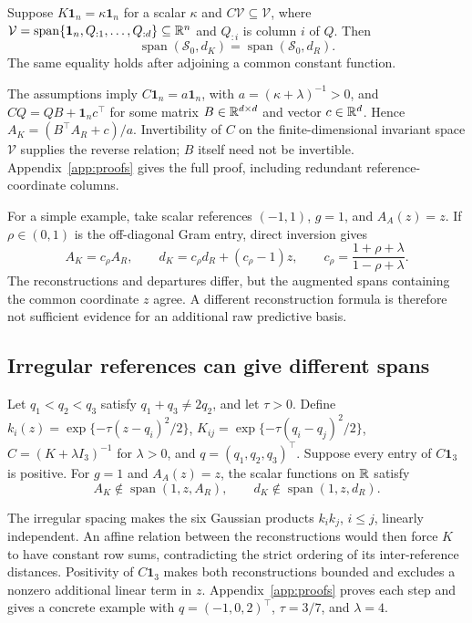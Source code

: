 \begin{proposition}\label{prop:equal}
Suppose $K\mathbf1_n=\kappa\mathbf1_n$ for a scalar $\kappa$ and $C\mathcal V\subseteq\mathcal V$, where
$\mathcal V=\operatorname{span}\{\mathbf1_n,Q_{:1},\ldots,Q_{:d}\}\subseteq\mathbb R^n$ and $Q_{:i}$ is column $i$ of $Q$. Then
\[
 \operatorname{span}(\mathcal S_0,d_K)=\operatorname{span}(\mathcal S_0,d_R).
\]
The same equality holds after adjoining a common constant function.
\end{proposition}

The assumptions imply $C\mathbf1_n=a\mathbf1_n$, with $a=(\kappa+\lambda)^{-1}>0$, and $CQ=QB+\mathbf1_n c^\top$ for some matrix $B\in\mathbb R^{d\times d}$ and vector $c\in\mathbb R^d$. Hence $A_K=(B^\top A_R+c)/a$. Invertibility of $C$ on the finite-dimensional invariant space $\mathcal V$ supplies the reverse relation; $B$ itself need not be invertible. Appendix~\ref{app:proofs} gives the full proof, including redundant reference-coordinate columns.

For a simple example, take scalar references $(-1,1)$, $g=1$, and $A_A(z)=z$. If $\rho\in(0,1)$ is the off-diagonal Gram entry, direct inversion gives
\[
 A_K=c_\rho A_R,\qquad
 d_K=c_\rho d_R+(c_\rho-1)z,\qquad
 c_\rho=\frac{1+\rho+\lambda}{1-\rho+\lambda}.
\]
The reconstructions and departures differ, but the augmented spans containing the common coordinate $z$ agree. A different reconstruction formula is therefore not sufficient evidence for an additional raw predictive basis.

\subsection{Irregular references can give different spans}
\begin{proposition}\label{prop:distinct}
Let $q_1<q_2<q_3$ satisfy $q_1+q_3\ne2q_2$, and let $\tau>0$. Define $k_i(z)=\exp\{-\tau(z-q_i)^2/2\}$, $K_{ij}=\exp\{-\tau(q_i-q_j)^2/2\}$, $C=(K+\lambda I_3)^{-1}$ for $\lambda>0$, and $q=(q_1,q_2,q_3)^\top$. Suppose every entry of $C\mathbf1_3$ is positive. For $g=1$ and $A_A(z)=z$, the scalar functions on $\mathbb R$ satisfy
\[
 A_K\notin\operatorname{span}(1,z,A_R),\qquad
 d_K\notin\operatorname{span}(1,z,d_R).
\]
\end{proposition}

The irregular spacing makes the six Gaussian products $k_i k_j$, $i\leq j$, linearly independent. An affine relation between the reconstructions would then force $K$ to have constant row sums, contradicting the strict ordering of its inter-reference distances. Positivity of $C\mathbf1_3$ makes both reconstructions bounded and excludes a nonzero additional linear term in $z$. Appendix~\ref{app:proofs} proves each step and gives a concrete example with $q=(-1,0,2)^\top$, $\tau=3/7$, and $\lambda=4$.

